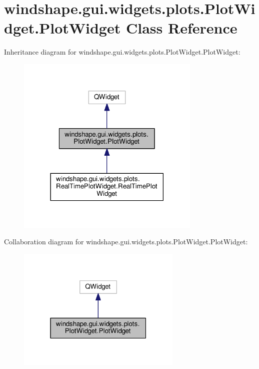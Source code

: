 \hypertarget{classwindshape_1_1gui_1_1widgets_1_1plots_1_1_plot_widget_1_1_plot_widget}{}\section{windshape.\+gui.\+widgets.\+plots.\+Plot\+Widget.\+Plot\+Widget Class Reference}
\label{classwindshape_1_1gui_1_1widgets_1_1plots_1_1_plot_widget_1_1_plot_widget}


Inheritance diagram for windshape.\+gui.\+widgets.\+plots.\+Plot\+Widget.\+Plot\+Widget\+:\nopagebreak
\begin{figure}[H]
\begin{center}
\leavevmode
\includegraphics[width=249pt]{classwindshape_1_1gui_1_1widgets_1_1plots_1_1_plot_widget_1_1_plot_widget__inherit__graph}
\end{center}
\end{figure}


Collaboration diagram for windshape.\+gui.\+widgets.\+plots.\+Plot\+Widget.\+Plot\+Widget\+:\nopagebreak
\begin{figure}[H]
\begin{center}
\leavevmode
\includegraphics[width=223pt]{classwindshape_1_1gui_1_1widgets_1_1plots_1_1_plot_widget_1_1_plot_widget__coll__graph}
\end{center}
\end{figure}
